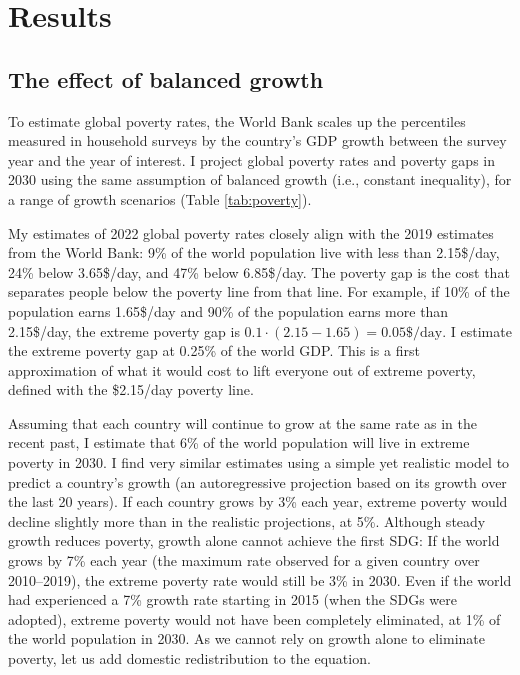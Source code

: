 \section{Results}
\subsection{The effect of balanced growth}

To estimate global poverty rates, the World Bank scales up the percentiles measured in household surveys by the country's GDP growth between the survey year and the year of interest. I project global poverty rates and poverty gaps in 2030 using the same assumption of balanced growth (i.e., constant inequality), for a range of growth scenarios (Table \ref{tab:poverty}). 



My estimates of 2022 global poverty rates closely align with the 2019 estimates from the World Bank: 9\% of the world population live with less than 2.15\$/day, 24\% below 3.65\$/day, and 47\% below 6.85\$/day. 
The poverty gap is the cost that separates people below the poverty line from that line. For example, if 10\% of the population earns 1.65\$/day and 90\% of the population earns more than 2.15\$/day, the extreme poverty gap is $0.1 \cdot (2.15 - 1.65) = 0.05\$/\text{day}$. %
I estimate the extreme poverty gap at 0.25\% of the world GDP. This is a first approximation of what it would cost to lift everyone out of extreme poverty, defined with the \$2.15/day poverty line. 

Assuming that each country will continue to grow at the same rate as in the recent past, %
I estimate that 6\% of the world population will live in extreme poverty in 2030. I find very similar estimates using a simple yet realistic model to predict a country's growth (an autoregressive projection based on its growth over the last 20 years). 
If each country grows by 3\% each year, extreme poverty would decline slightly more than in the realistic projections, at 5\%. 
Although steady growth reduces poverty, growth alone cannot achieve the first SDG: If the world grows by 7\% each year (the maximum rate observed for a given country over 2010--2019), %
the extreme poverty rate would still be 3\% in 2030. Even if the world had experienced a 7\% growth rate starting in 2015 (when the SDGs were adopted), extreme poverty would not have been completely eliminated, at 1\% of the world population in 2030. 
As we cannot rely on growth alone to eliminate poverty, let us add domestic redistribution to the equation.


